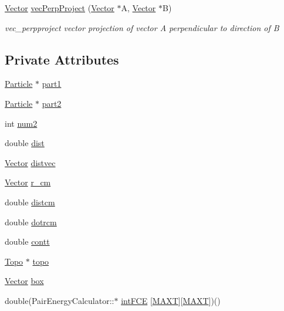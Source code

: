 \begin{DoxyCompactItemize}
\hyperlink{class_vector}{Vector} \hyperlink{class_pair_energy_calculator_abf018dcd60f682fbc69e7f3d59aec1b5}{vec\+Perp\+Project} (\hyperlink{class_vector}{Vector} $\ast$A, \hyperlink{class_vector}{Vector} $\ast$B)
\begin{DoxyCompactList}\small\item\em vec\+\_\+perpproject vector projection of vector A perpendicular to direction of B \end{DoxyCompactList}\end{DoxyCompactItemize}
\subsection*{Private Attributes}
\begin{DoxyCompactItemize}
\item 
\hyperlink{class_particle}{Particle} $\ast$ \hyperlink{class_pair_energy_calculator_a168122b4b21b48d25093a9e314045929}{part1}
\item 
\hyperlink{class_particle}{Particle} $\ast$ \hyperlink{class_pair_energy_calculator_a5930e66e7a0e9c3b2bd7e76391854ad2}{part2}
\item 
int \hyperlink{class_pair_energy_calculator_a437c68a040fd7eb9f261bc2c22cf3bcf}{num2}
\item 
double \hyperlink{class_pair_energy_calculator_a088da797962434ca91db0371df26658f}{dist}
\item 
\hyperlink{class_vector}{Vector} \hyperlink{class_pair_energy_calculator_a55811135e825d49327759d985d97b411}{distvec}
\item 
\hyperlink{class_vector}{Vector} \hyperlink{class_pair_energy_calculator_aa927503ba2066bfcd0fb072e0b7e12cc}{r\+\_\+cm}
\item 
double \hyperlink{class_pair_energy_calculator_a458286e3bf6945bcbbfbb8f6cf5176f5}{distcm}
\item 
double \hyperlink{class_pair_energy_calculator_a900648b1736a83a26032f362826a03b7}{dotrcm}
\item 
double \hyperlink{class_pair_energy_calculator_a65d98db836fcf54e21274113ba3f42c4}{contt}
\item 
\hyperlink{struct_topo}{Topo} $\ast$ \hyperlink{class_pair_energy_calculator_a89462e46d51f1247121a58a71831d2a2}{topo}
\item 
\hyperlink{class_vector}{Vector} \hyperlink{class_pair_energy_calculator_a4c8925567dcb6e14f832a13474486d57}{box}
\item 
double(Pair\+Energy\+Calculator\+::$\ast$ \hyperlink{class_pair_energy_calculator_a59ee0e41cc441aa2138f978dbf68a070}{int\+F\+C\+E} \mbox{[}\hyperlink{macros_8h_a3f79fdecc884eb98c97d1bdc77455295}{M\+A\+X\+T}\mbox{]}\mbox{[}\hyperlink{macros_8h_a3f79fdecc884eb98c97d1bdc77455295}{M\+A\+X\+T}\mbox{]})()
\end{DoxyCompactItemize}


